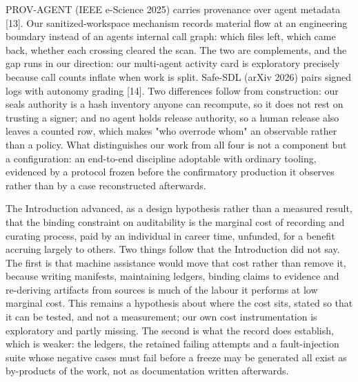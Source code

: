 \documentclass[
  english,
]{article}
\begin{document}
PROV-AGENT (IEEE e-Science 2025) carries provenance over agent metadata {[}13{]}. Our sanitized-workspace mechanism records material flow at an engineering boundary instead of an agent\textquotesingle s internal call graph: which files left, which came back, whether each crossing cleared the scan. The two are complements, and the gap runs in our direction: our multi-agent activity card is exploratory precisely because call counts inflate when work is split. Safe-SDL (arXiv 2026) pairs signed logs with autonomy grading {[}14{]}. Two differences follow from construction: our seal\textquotesingle s authority is a hash inventory anyone can recompute, so it does not rest on trusting a signer; and no agent holds release authority, so a human release also leaves a counted row, which makes "who overrode whom" an observable rather than a policy. What distinguishes our work from all four is not a component but a configuration: an end-to-end discipline adoptable with ordinary tooling, evidenced by a protocol frozen before the confirmatory production it observes rather than by a case reconstructed afterwards.

The Introduction advanced, as a design hypothesis rather than a measured result, that the binding constraint on auditability is the marginal cost of recording and curating process, paid by an individual in career time, unfunded, for a benefit accruing largely to others. Two things follow that the Introduction did not say. The first is that machine assistance would move that cost rather than remove it, because writing manifests, maintaining ledgers, binding claims to evidence and re-deriving artifacts from sources is much of the labour it performs at low marginal cost. This remains a hypothesis about where the cost sits, stated so that it can be tested, and not a measurement; our own cost instrumentation is exploratory and partly missing. The second is what the record does establish, which is weaker: the ledgers, the retained failing attempts and a fault-injection suite whose negative cases must fail before a freeze may be generated all exist as by-products of the work, not as documentation written afterwards.
\end{document}
